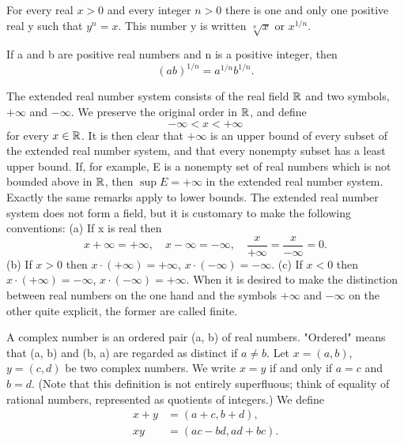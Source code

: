 \begin{theorem} %
  \label{thm:chap1:existence_of_nth_roots}
  For every real $x>0$ and every integer $n>0$ there is one and only
  one positive real y such that $y^n = x$.
  This number y is written $\sqrt[n]{x}$ or $x^{1/n}$.
\end{theorem}

\begin{corollary} %
  \label{cor:chap1:product_of_nth_roots}
  If a and b are positive real numbers and n is a positive integer, then
  \[ (ab)^{1/n} = a^{1/n}b^{1/n}. \]
\end{corollary}


\begin{definition} %
  \label{def:chap1:extended_real_numbers}
  The extended real number system consists of the real field $\mathbb{R}$ and
  two symbols, $+\infty$ and $-\infty$. We preserve the original
  order in $\mathbb{R}$, and define
  \[ -\infty < x < +\infty \]
  for every $x \in \mathbb{R}$.
  It is then clear that $+\infty$ is an upper bound of every subset
  of the extended real number system, and that every nonempty subset
  has a least upper bound. If, for example, E is a nonempty set of
  real numbers which is not bounded above in $\mathbb{R}$, then $\sup E =
  +\infty$ in the extended real number system.
  Exactly the same remarks apply to lower bounds.
  The extended real number system does not form a field, but it is
  customary to make the following conventions:
  (a) If x is real then
  \[ x + \infty = +\infty, \quad x - \infty = -\infty, \quad
  \frac{x}{+\infty} = \frac{x}{-\infty} = 0. \]
  (b) If $x > 0$ then $x \cdot (+\infty) = +\infty$, $x \cdot
  (-\infty) = -\infty$.
  (c) If $x < 0$ then $x \cdot (+\infty) = -\infty$, $x \cdot
  (-\infty) = +\infty$.
  When it is desired to make the distinction between real numbers on
  the one hand and the symbols $+\infty$ and $-\infty$ on the other
  quite explicit, the former are called finite.
\end{definition}



\begin{definition} %
  \label{def:chap1:complex_number_operations}
  A complex number is an ordered pair (a, b) of real numbers.
  "Ordered" means that (a, b) and (b, a) are regarded as distinct if $a \ne b$.
  Let $x = (a, b)$, $y = (c, d)$ be two complex numbers. We write
  $x=y$ if and only if $a=c$ and $b=d$. (Note that this definition is
    not entirely superfluous; think of equality of rational numbers,
  represented as quotients of integers.) We define
  \begin{align*}
    x+y &= (a+c, b+d), \\
    xy &= (ac-bd, ad+bc).
  \end{align*}
\end{definition}

